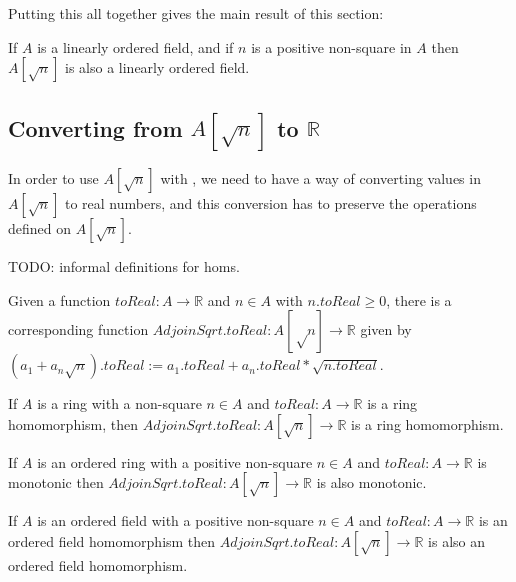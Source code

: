 Putting this all together gives the main result of this section:

\begin{theorem}
  \label{thm:adjoinOrderedField}

  If $A$ is a linearly ordered field, and if $n$ is a positive non-square in $A$
  then $A[\sqrt{n}]$ is also a linearly ordered field.
\end{theorem}

\subsection{Converting from $A[\sqrt{n}]$ to $ℝ$}

In order to use $A[\sqrt{n}]$ with , we need to have a way of
converting values in $A[\sqrt{n}]$ to real numbers, and this conversion has to preserve
the operations defined on $A[\sqrt{n}]$.

TODO: informal definitions for homs.


\begin{definition}
  \label{def:adjoinToReal}
  Given a function $toReal : A → ℝ$ and $n ∈ A$ with $n.toReal \geq 0$,
  there is a corresponding function $AdjoinSqrt.toReal : A[√n] → ℝ$ given by
  $(a_1 + a_n\sqrt{n}).toReal := a_1.toReal + a_n.toReal * \sqrt{n.toReal}$.
\end{definition}

\begin{lemma}
  \label{thm:adjoinToRealRingHom}
  If $A$ is a ring with a non-square $n ∈ A$ and $toReal : A → ℝ$ is a
  ring homomorphism, then $AdjoinSqrt.toReal : A[\sqrt{n}] → ℝ$ is a ring
  homomorphism.
\end{lemma}

\begin{lemma}
  \label{thm:adjoinToRealOrderHom}
  If $A$ is an ordered ring with a positive non-square $n ∈ A$ and
  $toReal : A → ℝ$ is monotonic then $AdjoinSqrt.toReal : A[\sqrt{n}] → ℝ$ is
  also monotonic.
\end{lemma}


\begin{lemma}
  \label{thm:adjoinToRealOrderedFieldHom}
  If $A$ is an ordered field with a positive non-square $n ∈ A$ and $toReal : A
  → ℝ$ is an ordered field homomorphism then $AdjoinSqrt.toReal : A[\sqrt{n}] →
  ℝ$ is also an ordered field homomorphism.
\end{lemma}

